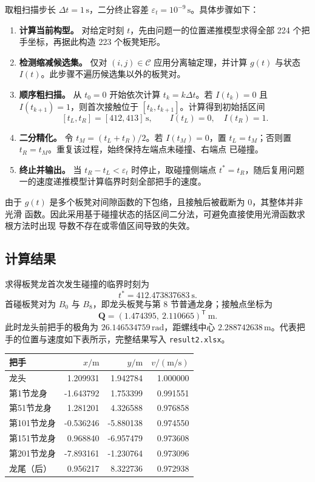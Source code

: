 \documentclass[
  11pt,
  UTF8]{ctexart}
\begin{document}
取粗扫描步长 \(\Delta t=1\,\mathrm s\)，二分终止容差
\(\varepsilon_t=10^{-9}\,\mathrm s\)。具体步骤如下：

\begin{enumerate}
\def\labelenumi{\arabic{enumi}.}
\item
  \textbf{计算当前构型。} 对给定时刻 \(t\)，先由问题一的位置递推模型求得全部
  224 个把手坐标，再据此构造 223 个板凳矩形。
\item
  \textbf{检测缩减候选集。} 仅对 \((i,j)\in\mathcal C\) 应用分离轴定理，并计算
  \(g(t)\) 与状态 \(I(t)\)。此步骤不遍历候选集以外的板凳对。
\item
  \textbf{顺序粗扫描。} 从 \(t_0=0\) 开始依次计算
  \(t_k=k\Delta t\)。若 \(I(t_k)=0\) 且 \(I(t_{k+1})=1\)，则首次接触位于
  \([t_k,t_{k+1}]\)。计算得到初始括区间
  \[
  [t_L,t_R]=[412,413]\,\mathrm s,
  \qquad I(t_L)=0,\quad I(t_R)=1.
  \]
\item
  \textbf{二分精化。} 令 \(t_M=(t_L+t_R)/2\)。若 \(I(t_M)=0\)，置
  \(t_L=t_M\)；否则置 \(t_R=t_M\)。重复该过程，始终保持左端点未碰撞、右端点
  已碰撞。
\item
  \textbf{终止并输出。} 当 \(t_R-t_L<\varepsilon_t\) 时停止，取碰撞侧端点
  \(t^*=t_R\)，随后复用问题一的速度递推模型计算临界时刻全部把手的速度。
\end{enumerate}

由于 \(g(t)\) 是多个板凳对间隙函数的下包络，且接触后被截断为 0，其整体并非光滑
函数。因此采用基于碰撞状态的括区间二分法，可避免直接使用光滑函数求根方法时出现
导数不存在或零值区间导致的失效。

\subsection{计算结果}

求得板凳龙首次发生碰撞的临界时刻为
\[
\boxed{t^*=412.473837683\ \mathrm s}.
\]
首碰板凳对为 \(B_0\) 与 \(B_8\)，即龙头板凳与第 8 节普通龙身；接触点坐标为
\[
\boldsymbol Q=(1.474395,\ 2.110665)^{\mathsf T}\ \mathrm m.
\]
此时龙头前把手的极角为 \(26.146534759\,\mathrm{rad}\)，距螺线中心
\(2.288742638\,\mathrm m\)。代表把手的位置与速度如下表所示，完整结果写入
\texttt{result2.xlsx}。

\begin{longtable}[]{@{}lrrr@{}}
\toprule
把手 & \(x/\mathrm m\) & \(y/\mathrm m\) & \(v/(\mathrm{m/s})\) \\
\midrule
\endhead
龙头 & 1.209931 & 1.942784 & 1.000000 \\
第1节龙身 & -1.643792 & 1.753399 & 0.991551 \\
第51节龙身 & 1.281201 & 4.326588 & 0.976858 \\
第101节龙身 & -0.536246 & -5.880138 & 0.974550 \\
第151节龙身 & 0.968840 & -6.957479 & 0.973608 \\
第201节龙身 & -7.893161 & -1.230764 & 0.973096 \\
龙尾（后） & 0.956217 & 8.322736 & 0.972938 \\
\bottomrule
\end{longtable}
\end{document}
